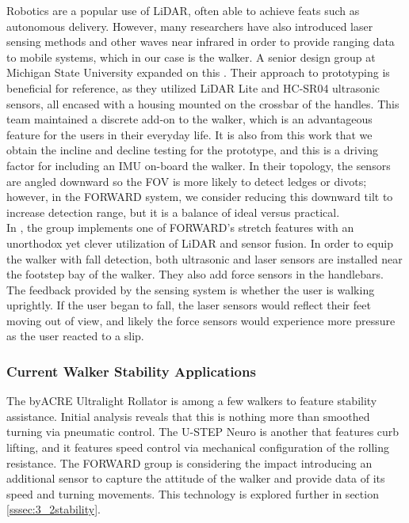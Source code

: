 \noindent Robotics are a popular use of LiDAR, often able to achieve feats such as autonomous delivery. However, many researchers have also introduced laser sensing methods and other waves near infrared in order to provide ranging data to mobile systems, which in our case is the walker. A senior design group at Michigan State University expanded on this \cite{mstate}. Their approach to prototyping is beneficial for reference, as they utilized LiDAR Lite and HC-SR04 ultrasonic sensors, all encased with a housing mounted on the crossbar of the handles. This team maintained a discrete add-on to the walker, which is an advantageous feature for the users in their everyday life. It is also from this work that we obtain the incline and decline testing for the prototype, and this is a driving factor for including an IMU on-board the walker. In their topology, the sensors are angled downward so the FOV is more likely to detect ledges or divots; however, in the FORWARD system, we consider reducing this downward tilt to increase detection range, but it is a balance of ideal versus practical.\\

\noindent In \cite{FallDetect}, the group implements one of FORWARD's stretch features with an unorthodox yet clever utilization of LiDAR and sensor fusion. In order to equip the walker with fall detection, both ultrasonic and laser sensors are installed near the footstep bay of the walker. They also add force sensors in the handlebars. The feedback provided by the sensing system is whether the user is walking uprightly. If the user began to fall, the laser sensors would reflect their feet moving out of view, and likely the force sensors would experience more pressure as the user reacted to a slip.\\

\subsubsection{Current Walker Stability Applications}
\noindent The byACRE Ultralight Rollator \cite{byACRE} is among a few walkers to feature stability assistance. Initial analysis reveals that this is nothing more than smoothed turning via pneumatic control. The U-STEP Neuro \cite{ustep} is another that features curb lifting, and it features speed control via mechanical configuration of the rolling resistance. The FORWARD group is considering the impact introducing an additional sensor to capture the attitude of the walker and provide data of its speed and turning movements. This technology is explored further in section \ref{sssec:3_2stability}.\\

